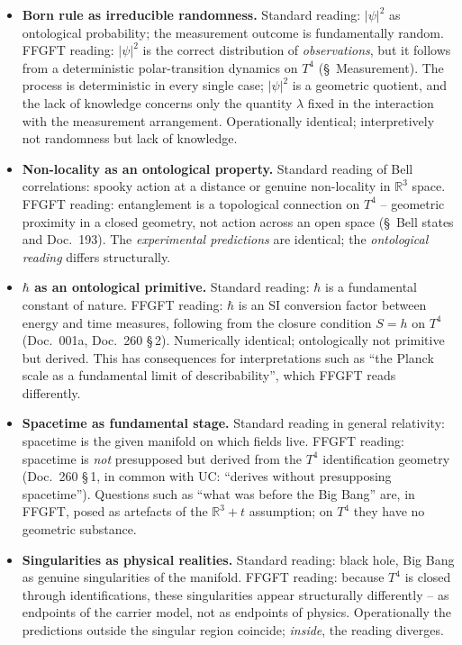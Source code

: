 \begin{itemize}[leftmargin=2em,itemsep=4pt,topsep=4pt]
  \item \textbf{Born rule as irreducible randomness.}
        Standard reading: $|\psi|^2$ as ontological probability; the
        measurement outcome is fundamentally random. FFGFT reading:
        $|\psi|^2$ is the correct distribution of \emph{observations},
        but it follows from a deterministic polar-transition dynamics
        on $T^4$ (§~Measurement). The process is deterministic in every
        single case; $|\psi|^2$ is a geometric quotient, and the lack
        of knowledge concerns only the quantity $\lambda$ fixed in the
        interaction with the measurement arrangement. Operationally
        identical; interpretively not randomness but lack of
        knowledge.

  \item \textbf{Non-locality as an ontological property.}
        Standard reading of Bell correlations: spooky action at a
        distance or genuine non-locality in $\mathbb{R}^3$ space.
        FFGFT reading: entanglement is a topological connection on
        $T^4$ -- geometric proximity in a closed geometry, not action
        across an open space (§~Bell states and
        Doc.~193). The
        \emph{experimental predictions} are identical; the
        \emph{ontological reading} differs structurally.

  \item \textbf{$\hbar$ as an ontological primitive.}
        Standard reading: $\hbar$ is a fundamental constant of nature.
        FFGFT reading: $\hbar$ is an SI conversion factor between
        energy and time measures, following from the closure condition
        $S=h$ on $T^4$ (Doc.~001a, Doc.~260 §\,2). Numerically
        identical; ontologically not primitive but derived. This has
        consequences for interpretations such as ``the Planck scale as
        a fundamental limit of describability'', which FFGFT reads
        differently.

  \item \textbf{Spacetime as fundamental stage.}
        Standard reading in general relativity: spacetime is the given
        manifold on which fields live. FFGFT reading: spacetime is
        \emph{not} presupposed but derived from the $T^4$
        identification geometry (Doc.~260 §\,1, in common with UC:
        ``derives without presupposing spacetime''). Questions such as
        ``what was before the Big Bang'' are, in FFGFT, posed as
        artefacts of the $\mathbb{R}^3 + t$ assumption; on $T^4$ they
        have no geometric substance.

  \item \textbf{Singularities as physical realities.}
        Standard reading: black hole, Big Bang as genuine
        singularities of the manifold. FFGFT reading: because $T^4$
        is closed through identifications, these singularities appear
        structurally differently -- as endpoints of the carrier model,
        not as endpoints of physics. Operationally the predictions
        outside the singular region coincide; \emph{inside}, the
        reading diverges.
\end{itemize}

